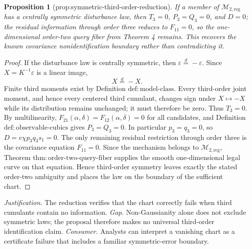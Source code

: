 \documentclass{article}
\newtheorem{proposition}{Proposition}
\begin{document}
\begin{proposition}[prop:symmetric-third-order-reduction]\label{prop:symmetric-third-order-reduction}
If a member of \(\mathcal M_{2,\mathrm{reg}}\) has a centrally symmetric disturbance law, then \(T_3=0\), \(P_3=Q_3=0\), and \(D=0\); the residual information through order three reduces to \(F_{11}=0\), so the one-dimensional order-two query fiber from Theorem 4 remains. This recovers the known covariance nonidentification boundary rather than contradicting it.
\end{proposition}
\begin{proof}
If the disturbance law is centrally symmetric, then \(\varepsilon\stackrel{d}{=}-\varepsilon\). Since \(X=K^{-1}\varepsilon\) is a linear image,
\[
X\stackrel{d}{=}-X.
\]
Finite third moments exist by Definition \(\mathrm{def:model\mbox{-}class}\). Every third-order joint moment, and hence every centered third cumulant, changes sign under \(X\mapsto-X\) while its distribution remains unchanged; it must therefore be zero. Thus \(T_3=0\). By multilinearity, \(F_{21}(\alpha,\delta)=F_{12}(\alpha,\delta)=0\) for all candidates, and Definition \(\mathrm{def:observable\mbox{-}cubics}\) gives \(P_3=Q_3=0\). In particular \(p_3=q_3=0\), so \(D=v\chi p_3q_3s_1=0\). The only remaining residual restriction through order three is the covariance equation \(F_{11}=0\). Since the mechanism belongs to \(\mathcal M_{2,\mathrm{reg}}\), Theorem \(\mathrm{thm:order\mbox{-}two\mbox{-}query\mbox{-}fiber}\) supplies the smooth one-dimensional legal curve on that equation. Hence third-order symmetry leaves exactly the stated order-two ambiguity and places the law on the boundary of the sufficient chart.
\end{proof}
\par\smallskip\noindent \textit{Justification.} The reduction verifies that the chart correctly fails when third cumulants contain no information. \textit{Gap.} Non-Gaussianity alone does not exclude symmetric laws; the proposal therefore makes no universal third-order identification claim. \textit{Consumer.} Analysts can interpret a vanishing chart as a certificate failure that includes a familiar symmetric-error boundary.
\end{document}
